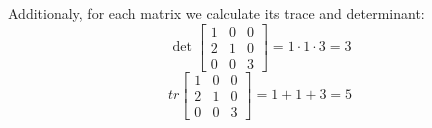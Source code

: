 Additionaly, for each matrix we calculate its trace and determinant:
\begin{equation*}
    \det{\begin{bmatrix}
        1 & 0 & 0 \\
        2 & 1 & 0 \\
        0 & 0 & 3 
    \end{bmatrix}} = 1 \cdot 1 \cdot 3 = 3
\end{equation*}
\begin{equation*}
    tr{\begin{bmatrix}
        1 & 0 & 0 \\
        2 & 1 & 0 \\
        0 & 0 & 3 
    \end{bmatrix}} = 1 + 1 + 3 = 5
\end{equation*}
